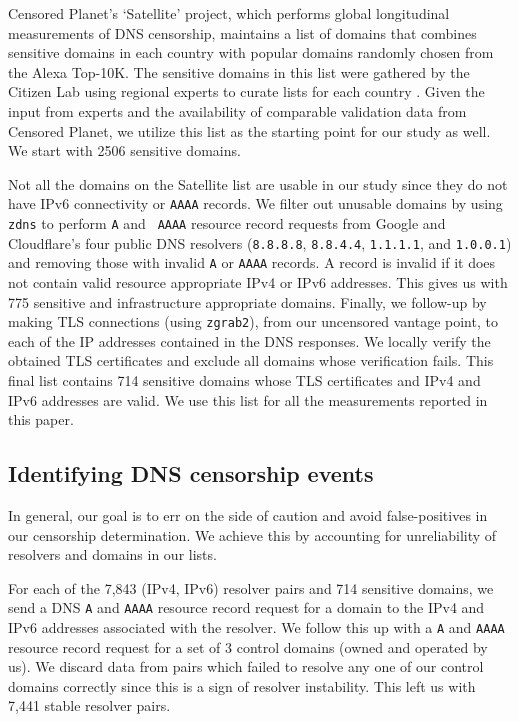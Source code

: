  Censored Planet's `Satellite' project,
which performs global longitudinal measurements of DNS censorship,
\cite{sundara2020censored} maintains a list of domains that combines sensitive
domains in each country with popular domains randomly chosen from the Alexa
Top-10K. The sensitive domains in this list were gathered by the Citizen Lab
using regional experts to curate lists for each country
\cite{citizenlab-blocklists}. Given the input from experts and the availability
of comparable validation data from Censored Planet, we utilize this list as the
starting point for our study as well. We start with 2506 sensitive domains.

 Not all the domains on the Satellite list
are usable in our study since they do not have IPv6 connectivity or {\tt AAAA}
records.
%
We filter out unusable domains by using {\tt zdns} to perform {\tt A} and {\tt
AAAA} resource record requests from Google and Cloudflare's four public DNS
resolvers ({\tt 8.8.8.8}, {\tt 8.8.4.4}, {\tt 1.1.1.1}, and {\tt 1.0.0.1}) and
removing those with invalid {\tt A} or {\tt AAAA} records. A record is invalid
if it does not contain valid resource appropriate IPv4 or IPv6 addresses. This
gives us with 775 sensitive and infrastructure appropriate domains.
%
Finally, we follow-up by making TLS connections (using {\tt zgrab2}), from our
uncensored vantage point, to each of the IP addresses contained in the DNS
responses. We locally verify the obtained TLS certificates and exclude all
domains whose verification fails. 
%
This final list contains 714 sensitive domains whose TLS certificates and IPv4
and IPv6 addresses are valid. We use this list for all the measurements
reported in this paper.

\subsection{Identifying DNS censorship events} \label{sec:v4vsv6-methodology:censorship}
In general, our goal is to err on the side of caution and avoid false-positives
in our censorship determination. We achieve this by accounting for
unreliability of resolvers and domains in our lists.

For each of the 7,843 (IPv4, IPv6) resolver pairs and 714 sensitive domains, we
send a DNS {\tt A} and {\tt AAAA} resource record request for a domain to the
IPv4 and IPv6 addresses associated with the resolver. We follow this up with
a {\tt A} and {\tt AAAA} resource record request for a set of 3 control domains
(owned and operated by us).
%
We discard data from pairs which failed to resolve any one of our control
domains correctly since this is a sign of resolver instability. This left us
with 7,441 stable resolver pairs.
%

